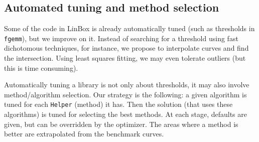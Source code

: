 \documentclass[a4paper]{article}
\def\textsf#1{{\biolinum #1}}
\def\scsf#1{{\scshape \biolinum #1}} %
\newcommand\linbox{\textsf{LinBox}\xspace}
\newcommand\fgemm{\texttt{fgemm}\xspace}
\newcommand\fflasffpack{\scsf{Fflas--Ffpack}\xspace}
\begin{document}
\subsection{Automated tuning and method selection}
%
Some of the code in \linbox is already automatically tuned (such as thresholds
in \fgemm), but we improve on it.
Instead of searching for a
threshold using fast dichotomous techniques, for instance, we propose to
interpolate curves and find the intersection. Using least squares fitting, we
may even tolerate outliers (but this is time consuming).
%
\par
%
Automatically tuning a library is not only about thresholds, it may
also involve method/algorithm selection. Our strategy is the following: a given
algorithm is tuned for each {\tt Helper} (method) it has.  Then the solution
(that uses these algorithms) is tuned for selecting the best methods.  At each
stage, defaults are given, but can be overridden by the optimizer. The areas
where a method is better are extrapolated from the benchmark curves.
%
%
%
%
% 
%
%
%
%
\fi %
% 
% 
% 
% 
\end{document}
